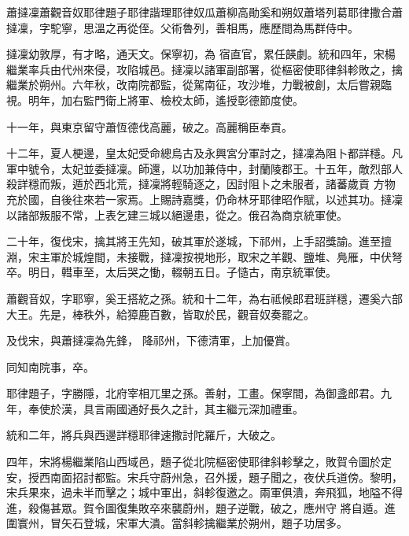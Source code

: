 
\begin{pinyinscope}

 蕭撻凜蕭觀音奴耶律題子耶律諧理耶律奴瓜蕭柳高勛奚和朔奴蕭塔列葛耶律撒合蕭撻凜，字駝寧，思溫之再從侄。父術魯列，善相馬，應歷間為馬群侍中。



 撻凜幼敦厚，有才略，通天文。保寧初，為
 宿直官，累任韺劇。統和四年，宋楊繼業率兵由代州來侵，攻陷城邑。撻凜以諸軍副部署，從樞密使耶律斜軫敗之，擒繼業於朔州。六年秋，改南院都監，從駕南征，攻沙堆，力戰被創，太后嘗親臨視。明年，加右監門衛上將軍、檢校太師，遙授彰德節度使。



 十一年，與東京留守蕭恆德伐高麗，破之。高麗稱臣奉貢。



 十二年，夏人梗邊，皇太妃受命總烏古及永興宮分軍討之，撻凜為阻卜都詳穩。凡軍中號令，太妃並委撻凜。師還，以功加兼侍中，封蘭陵郡王。十五年，敵烈部人殺詳穩而叛，遁於西北荒，撻凜將輕騎逐之，因討阻卜之未服者，諸蕃歲貢
 方物充於國，自後往來若一家焉。上賜詩嘉獎，仍命林牙耶律昭作賦，以述其功。撻凜以諸部叛服不常，上表乞建三城以絕邊患，從之。俄召為商京統軍使。



 二十年，復伐宋，擒其將王先知，破其軍於遂城，下祁州，上手詔獎諭。進至擅淵，宋主軍於城煌間，未接戰，撻凜按視地形，取宋之羊觀、鹽堆、鳧雁，中伏弩卒。明日，轊車至，太后哭之慟，輟朝五日。子慥古，南京統軍使。



 蕭觀音奴，字耶寧，奚王搭紇之孫。統和十二年，為右祗候郎君班詳穩，遷奚六部大王。先是，棒秩外，給獐鹿百數，皆取於民，觀音奴奏罷之。



 及伐宋，與蕭撻凜為先鋒，
 降祁州，下德清軍，上加優賞。



 同知南院事，卒。



 耶律題子，字勝隱，北府宰相兀里之孫。善射，工畫。保寧間，為御盞郎君。九年，奉使於漢，具言兩國通好長久之計，其主繼元深加禮重。



 統和二年，將兵與西邊詳穩耶律速撒討陀羅斤，大破之。



 四年，宋將楊繼業陷山西域邑，題子從北院樞密使耶律斜軫擊之，敗賀令圖於定安，授西南面招討都監。宋兵守蔚州急，召外援，題子聞之，夜伏兵道傍。黎明，宋兵果來，過未半而擊之；城中軍出，斜軫復邀之。兩軍俱潰，奔飛狐，地隘不得進，殺傷甚眾。賀令圖復集敗卒來襲蔚州，題子逆戰，破之，應州守
 將自遁。進圍寰州，冒矢石登城，宋軍大潰。當斜軫擒繼業於朔州，題子功居多。




\end{pinyinscope}
